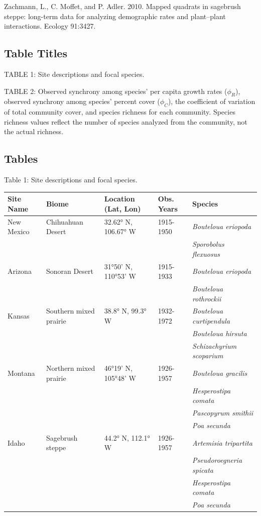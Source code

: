 \documentclass[12pt,]{article}
\begin{document}
Zachmann, L., C. Moffet, and P. Adler. 2010. Mapped quadrats in
sagebrush steppe: long-term data for analyzing demographic rates and
plant--plant interactions. Ecology 91:3427.

\newpage{}

\subsection{Table Titles}\label{tables}
TABLE 1: Site descriptions and focal species.

TABLE 2: Observed synchrony among species' per capita growth rates ($\phi_{R}$), observed synchrony among species' percent cover ($\phi_{C}$), the coefficient of variation of total community cover, and species richness for each community. Species richness values reflect the number of species analyzed from the community, not the actual richness.

\newpage{}

\subsection{Tables}\label{tables}
\singlespacing

Table 1: Site descriptions and focal species. \footnotesize

\begin{longtable}[c]{@{}lllll@{}}
\toprule
Site Name & Biome & Location (Lat, Lon) & Obs. Years &
Species\tabularnewline
\midrule
\endhead
New Mexico & Chihuahuan Desert & 32.62° N, 106.67° W & 1915-1950 &
\emph{Bouteloua eriopoda}\tabularnewline
& & & & \emph{Sporobolus flexuosus}\tabularnewline
Arizona & Sonoran Desert & 31°50' N, 110°53' W & 1915-1933 &
\emph{Bouteloua eriopoda}\tabularnewline
& & & & \emph{Bouteloua rothrockii}\tabularnewline
Kansas & Southern mixed prairie & 38.8° N, 99.3° W & 1932-1972 &
\emph{Bouteloua curtipendula}\tabularnewline
& & & & \emph{Bouteloua hirsuta}\tabularnewline
& & & & \emph{Schizachyrium scoparium}\tabularnewline
Montana & Northern mixed prairie & 46°19' N, 105°48' W & 1926-1957 &
\emph{Bouteloua gracilis}\tabularnewline
& & & & \emph{Hesperostipa comata}\tabularnewline
& & & & \emph{Pascopyrum smithii}\tabularnewline
& & & & \emph{Poa secunda}\tabularnewline
Idaho & Sagebrush steppe & 44.2° N, 112.1° W & 1926-1957 &
\emph{Artemisia tripartita}\tabularnewline
& & & & \emph{Pseudoroegneria spicata}\tabularnewline
& & & & \emph{Hesperostipa comata}\tabularnewline
& & & & \emph{Poa secunda}\tabularnewline
\bottomrule
\end{longtable}
\end{document}
